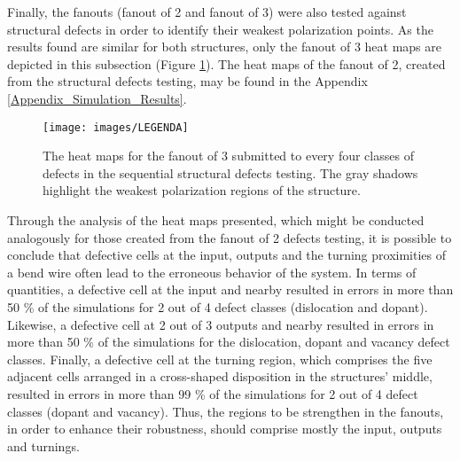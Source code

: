 Finally, the fanouts (fanout of 2 and fanout of 3) were also tested against structural defects in order to identify their weakest polarization points. As the results found are similar for both structures, only the fanout of 3 heat maps are depicted in this subsection (Figure \ref{figure:reg_fanout3_uniform}). The heat maps of the fanout of 2, created from the structural defects testing, may be found in the Appendix \ref{Appendix_Simulation_Results}.

\begin{figure}[!ht]
\center
{}
\hfill
{}
\hfill
{}
\hfill
{}
\linebreak
{\texttt{[image: images/LEGENDA]}
}
\caption{The heat maps for the fanout of 3 submitted to every four classes of defects in the sequential structural defects testing. The gray shadows highlight the weakest polarization regions of the structure.}
\label{figure:reg_fanout3_uniform}
\end{figure}

Through the analysis of the heat maps presented, which might be conducted analogously for those created from the fanout of 2 defects testing, it is possible to conclude that defective cells at the input, outputs and the turning proximities of a bend wire often lead to the erroneous behavior of the system. In terms of quantities, a defective cell at the input and nearby resulted in errors in more than 50 \% of the simulations for 2 out of 4 defect classes (dislocation and dopant). Likewise, a defective cell at 2 out of 3 outputs and nearby resulted in errors in more than 50 \% of the simulations for the dislocation, dopant and vacancy defect classes. Finally, a defective cell at the turning region, which comprises the five adjacent cells arranged in a cross-shaped disposition in the structures' middle, resulted in errors in more than 99 \% of the simulations for 2 out of 4 defect classes (dopant and vacancy). Thus, the regions to be strengthen in the fanouts, in order to enhance their robustness, should comprise mostly the input, outputs and turnings.

